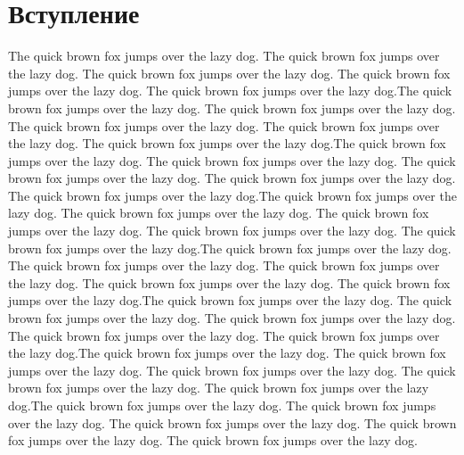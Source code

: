 \chapter{Вступление}
\label{cha:intro}
The quick brown fox jumps over the lazy dog.  The quick brown fox jumps over the lazy dog.  The quick brown fox jumps over the lazy dog.  The quick brown fox jumps over the lazy dog.  The quick brown fox jumps over the lazy dog.The quick brown fox jumps over the lazy dog.  The quick brown fox jumps over the lazy dog.  The quick brown fox jumps over the lazy dog.  The quick brown fox jumps over the lazy dog.  The quick brown fox jumps over the lazy dog.The quick brown fox jumps over the lazy dog.  The quick brown fox jumps over the lazy dog.  The quick brown fox jumps over the lazy dog.  The quick brown fox jumps over the lazy dog.  The quick brown fox jumps over the lazy dog.The quick brown fox jumps over the lazy dog.  The quick brown fox jumps over the lazy dog.  The quick brown fox jumps over the lazy dog.  The quick brown fox jumps over the lazy dog.  The quick brown fox jumps over the lazy dog.The quick brown fox jumps over the lazy dog.  The quick brown fox jumps over the lazy dog.  The quick brown fox jumps over the lazy dog.  The quick brown fox jumps over the lazy dog.  The quick brown fox jumps over the lazy dog.The quick brown fox jumps over the lazy dog.  The quick brown fox jumps over the lazy dog.  The quick brown fox jumps over the lazy dog.  The quick brown fox jumps over the lazy dog.  The quick brown fox jumps over the lazy dog.The quick brown fox jumps over the lazy dog.  The quick brown fox jumps over the lazy dog.  The quick brown fox jumps over the lazy dog.  The quick brown fox jumps over the lazy dog.  The quick brown fox jumps over the lazy dog.The quick brown fox jumps over the lazy dog.  The quick brown fox jumps over the lazy dog.  The quick brown fox jumps over the lazy dog. The quick brown fox jumps over the lazy dog.  The quick brown fox jumps over the lazy dog.
